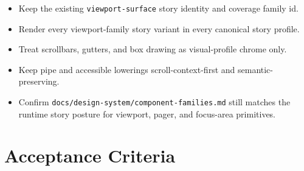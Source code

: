 \begin{itemize}
\tightlist
\item
  Keep the existing \texttt{v\allowbreak{}i\allowbreak{}e\allowbreak{}w\allowbreak{}p\allowbreak{}o\allowbreak{}r\allowbreak{}t\allowbreak{}-\allowbreak{}s\allowbreak{}u\allowbreak{}r\allowbreak{}f\allowbreak{}a\allowbreak{}c\allowbreak{}e} story identity and coverage family id.
\item
  Render every viewport-family story variant in every canonical story profile.
\item
  Treat scrollbars, gutters, and box drawing as visual-profile chrome only.
\item
  Keep pipe and accessible lowerings scroll-context-first and semantic-preserving.
\item
  Confirm \texttt{d\allowbreak{}o\allowbreak{}c\allowbreak{}s\allowbreak{}/\allowbreak{}d\allowbreak{}e\allowbreak{}s\allowbreak{}i\allowbreak{}g\allowbreak{}n\allowbreak{}-\allowbreak{}s\allowbreak{}y\allowbreak{}s\allowbreak{}t\allowbreak{}e\allowbreak{}m\allowbreak{}/\allowbreak{}c\allowbreak{}o\allowbreak{}m\allowbreak{}p\allowbreak{}o\allowbreak{}n\allowbreak{}e\allowbreak{}n\allowbreak{}t\allowbreak{}-\allowbreak{}f\allowbreak{}a\allowbreak{}m\allowbreak{}i\allowbreak{}l\allowbreak{}i\allowbreak{}e\allowbreak{}s\allowbreak{}.\allowbreak{}m\allowbreak{}d} still matches the runtime story posture for viewport, pager, and focus-area primitives.
\end{itemize}

\section{Acceptance Criteria}\label{record-100-acceptance-criteria}

